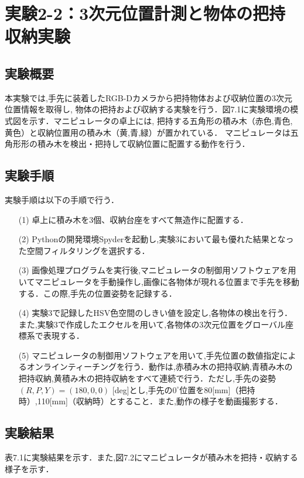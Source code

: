 \section{実験2-2：3次元位置計測と物体の把持収納実験}

\subsection{実験概要}
本実験では,手先に装着したRGB-Dカメラから把持物体および収納位置の3次元位置情報を取得し,
物体の把持および収納する実験を行う．図7.1に実験環境の模式図を示す．マニピュレータの卓上には,
把持する五角形の積み木（赤色,青色,黄色）と収納位置用の積み木（黄,青,緑）が置かれている．
マニピュレータは五角形形の積み木を検出・把持して収納位置に配置する動作を行う．

\subsection{実験手順}
実験手順は以下の手順で行う．

\begin{enumerate}
  \item[(1)] 卓上に積み木を3個、収納台座をすべて無造作に配置する．
  \item[(2)] Pythonの開発環境Spyderを起動し,実験3において最も優れた結果となった空間フィルタリングを選択する．
  \item[(3)] 画像処理プログラムを実行後,マニピュレータの制御用ソフトウェアを用いてマニピュレータを手動操作し,画像に各物体が現れる位置まで手先を移動する．この際,手先の位置姿勢を記録する．
  \item[(4)] 実験3で記録したHSV色空間のしきい値を設定し,各物体の検出を行う．また,実験3で作成したエクセルを用いて,各物体の3次元位置をグローバル座標系で表現する．
  \item[(5)] マニピュレータの制御用ソフトウェアを用いて,手先位置の数値指定によるオンラインティーチングを行う．動作は,赤積み木の把持収納,青積み木の把持収納,黄積み木の把持収納をすべて連続で行う．ただし,手先の姿勢$(R, P, Y) = (180, 0, 0)$ [deg]とし,手先の$0^{\circ}$位置を80[mm]（把持時）,110[mm]（収納時）とすること．また,動作の様子を動画撮影する．
\end{enumerate}

\subsection{実験結果}
表7.1に実験結果を示す．また,図7.2にマニピュレータが積み木を把持・収納する様子を示す．

